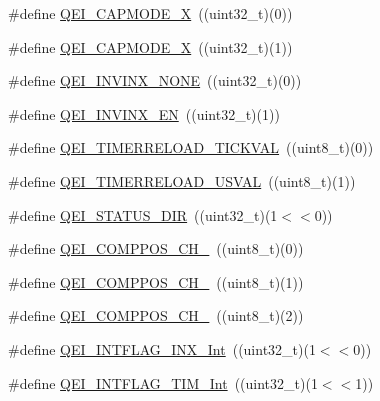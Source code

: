 \begin{DoxyCompactItemize}
\item 
\#define \hyperlink{group___q_e_i___public___macros_ga1c2eca335aca9bed2bb5305ff1affef7}{\-Q\-E\-I\-\_\-\-C\-A\-P\-M\-O\-D\-E\-\_\-X}~((uint32\-\_\-t)(0))
\item 
\#define \hyperlink{group___q_e_i___public___macros_ga3e650125e39f2f9d6fe8f1c2e4147b47}{\-Q\-E\-I\-\_\-\-C\-A\-P\-M\-O\-D\-E\-\_\-X}~((uint32\-\_\-t)(1))
\item 
\#define \hyperlink{group___q_e_i___public___macros_gaf5a7b0a1a513675800273f51b3fd2e4b}{\-Q\-E\-I\-\_\-\-I\-N\-V\-I\-N\-X\-\_\-\-N\-O\-N\-E}~((uint32\-\_\-t)(0))
\item 
\#define \hyperlink{group___q_e_i___public___macros_ga0f2f9afd7f46adf874e7627968f9759e}{\-Q\-E\-I\-\_\-\-I\-N\-V\-I\-N\-X\-\_\-\-E\-N}~((uint32\-\_\-t)(1))
\item 
\#define \hyperlink{group___q_e_i___public___macros_ga1b5cb4e5755fbcfe46c1743302ea218f}{\-Q\-E\-I\-\_\-\-T\-I\-M\-E\-R\-R\-E\-L\-O\-A\-D\-\_\-\-T\-I\-C\-K\-V\-A\-L}~((uint8\-\_\-t)(0))
\item 
\#define \hyperlink{group___q_e_i___public___macros_ga8de8a4acc16db48fe26ac872dda2d787}{\-Q\-E\-I\-\_\-\-T\-I\-M\-E\-R\-R\-E\-L\-O\-A\-D\-\_\-\-U\-S\-V\-A\-L}~((uint8\-\_\-t)(1))
\item 
\#define \hyperlink{group___q_e_i___public___macros_gab1151c4e822d3c8e9145d8ff84009aa2}{\-Q\-E\-I\-\_\-\-S\-T\-A\-T\-U\-S\-\_\-\-D\-I\-R}~((uint32\-\_\-t)(1$<$$<$0))
\item 
\#define \hyperlink{group___q_e_i___public___macros_ga72e128cb0a1b99f517999bf0fa25f613}{\-Q\-E\-I\-\_\-\-C\-O\-M\-P\-P\-O\-S\-\_\-\-C\-H\-\_}~((uint8\-\_\-t)(0))
\item 
\#define \hyperlink{group___q_e_i___public___macros_ga11e61fbcc2da19150d4243b70a45c567}{\-Q\-E\-I\-\_\-\-C\-O\-M\-P\-P\-O\-S\-\_\-\-C\-H\-\_}~((uint8\-\_\-t)(1))
\item 
\#define \hyperlink{group___q_e_i___public___macros_ga7361286e4cf215d251bd353cc78b3cf3}{\-Q\-E\-I\-\_\-\-C\-O\-M\-P\-P\-O\-S\-\_\-\-C\-H\-\_}~((uint8\-\_\-t)(2))
\item 
\#define \hyperlink{group___q_e_i___public___macros_ga3a8dcf67a425102120d1ace7fc04a5df}{\-Q\-E\-I\-\_\-\-I\-N\-T\-F\-L\-A\-G\-\_\-\-I\-N\-X\-\_\-\-Int}~((uint32\-\_\-t)(1$<$$<$0))
\item 
\#define \hyperlink{group___q_e_i___public___macros_gae9a04ea4d7c71518fd734830ecc1433d}{\-Q\-E\-I\-\_\-\-I\-N\-T\-F\-L\-A\-G\-\_\-\-T\-I\-M\-\_\-\-Int}~((uint32\-\_\-t)(1$<$$<$1))
\item 
$$
\end{DoxyCompactItemize}
